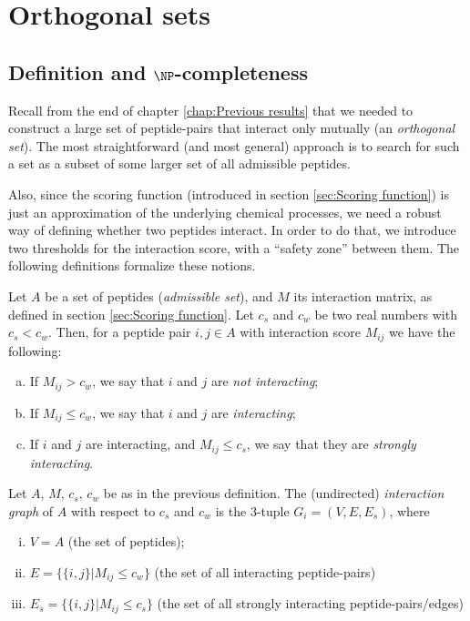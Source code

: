 \documentclass[12pt,a4paper,titlepage,openany]{report}
\begin{document}
\chapter{Orthogonal sets}
\thispagestyle{fancy}
\label{chap:Orthogonal sets}

\section{Definition and $\NP$-completeness}

Recall from the end of chapter \ref{chap:Previous results} that we needed to construct a large set of peptide-pairs that interact only mutually (an \emph{orthogonal set}). The most straightforward (and most general) approach is to search for such a set as a subset of some larger set of all admissible peptides. 

Also, since the scoring function (introduced in section \ref{sec:Scoring function}) is just an approximation of the underlying chemical processes, we need a robust way of defining whether two peptides interact. In order to do that, we introduce two thresholds for the interaction score, with a ``safety zone'' between them. The following definitions formalize these notions.

 
\begin{definition}
	Let $A$ be a set of peptides (\emph{admissible set}), and $M$ its interaction matrix, as defined in section \ref{sec:Scoring function}.
	Let $c_s$ and $c_w$ be two real numbers with $c_s < c_w$. Then, for a peptide pair $i, j\in A$ with interaction score $M_{ij}$ we have the following:
	\begin{enumerate}[a)]
		\item If $M_{ij} > c_w$, we say that $i$ and $j$ are \emph{not interacting};
		\item If $M_{ij} \leq c_w$, we say that $i$ and $j$ are \emph{interacting};
		\item If $i$ and $j$ are interacting, and $M_{ij} \leq c_s$, we say that they are \emph{strongly interacting}.
	\end{enumerate}
\end{definition}

\begin{definition}
	Let $A$, $M$, $c_s$, $c_w$ be as in the previous definition.
	The (undirected) \emph{interaction graph} of $A$ with respect to $c_s$ and $c_w$ is the 3-tuple $G_i = (V, E, E_s)$, where 
	\begin{enumerate}[i)]
		\item $V = A$ (the set of peptides);
		\item $E = \{ \{i, j\} | M_{ij} \leq c_w \}$ (the set of all interacting peptide-pairs) 
		\item $E_s = \{ \{i, j\} | M_{ij} \leq c_s \}$ (the set of all strongly interacting peptide-pairs/edges)
	\end{enumerate}
\end{definition}
\end{document}
